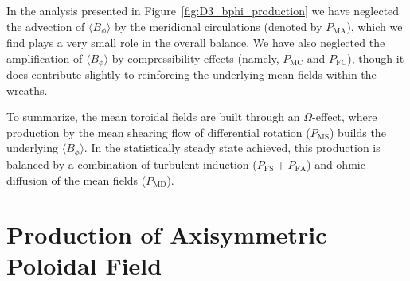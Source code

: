 In the analysis presented in Figure~\ref{fig:D3_bphi_production} we have
neglected the advection of $\langle B_\phi \rangle$ 
by the meridional circulations (denoted by $P_\mathrm{MA}$), which we find plays a very small role
in the overall balance.  We have also neglected the amplification of
$\langle B_\phi \rangle$ by compressibility effects (namely, 
$P_\mathrm{MC}$ and $P_\mathrm{FC}$), though it does
contribute slightly to reinforcing the underlying mean fields within
the wreaths.

To summarize, the mean toroidal fields are built through an
$\Omega$-effect, where production by the mean shearing flow of
differential rotation ($P_\mathrm{MS}$) builds the underlying
$\langle B_\phi \rangle$.  In the statistically steady state achieved, this
production is balanced by a combination of turbulent
induction ($P_\mathrm{FS} + P_\mathrm{FA}$) and ohmic diffusion of the
mean fields ($P_\mathrm{MD}$).

\section{Production of Axisymmetric Poloidal Field}

